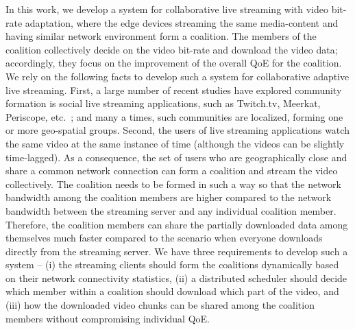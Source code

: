 In this work, we develop a system for collaborative live streaming with video bit-rate adaptation, where the edge devices streaming the same media-content and having similar network environment form a coalition. The members of the coalition collectively decide on the video bit-rate and download the video data; accordingly, they focus on the improvement of the overall QoE for the coalition.  We rely on the following facts to develop such a system for collaborative adaptive live streaming. First, a large number of recent studies have explored community formation is social live streaming applications, such as Twitch.tv, Meerkat, Periscope, etc.~\cite{weisz2007watching,hamilton2014streaming,pellicone2017game}; and many a times, such communities are localized, forming one or more geo-spatial groups. Second, the users of live streaming applications watch the same video at the same instance of time (although the videos can be slightly time-lagged). As a consequence, the set of users who are geographically close and share a common network connection can form a coalition and stream the video collectively. The coalition needs to be formed in such a way so that the network bandwidth among the coalition members are higher compared to the network bandwidth between the streaming server and any individual coalition member. Therefore, the coalition members can share the partially downloaded data among themselves much faster compared to the scenario when everyone downloads directly from the streaming server. We have three requirements to develop such a system -- (i) the streaming clients should form the coalitions dynamically based on their network connectivity statistics, (ii) a distributed scheduler should decide which member within a coalition should download which part of the video, and (iii) how the downloaded video chunks can be shared among the coalition members without compromising individual QoE. 

